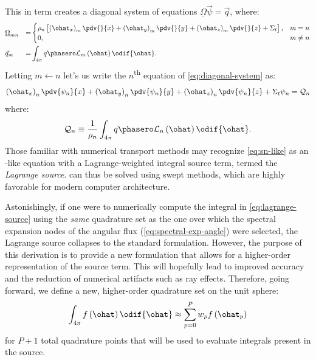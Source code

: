 This in term creates a diagonal system of equations $\underline{\Omega}\vec{\psi}=\vec{q}$, where:
\begin{equation}
  \label{eq:diagonal-system}
  \begin{aligned}
     & \underline{\Omega}_{mn} & = & \begin{cases}
                                       \rho_n\left[\left(\ohat_x\right)_m\pdv{}{x}+\left(\ohat_y\right)_m\pdv{}{y}+\left(\ohat_z\right)_m\pdv{}{z}+\Sigma_t\right], & m=n     \\
                                       0,                                                                                                                           & m\neq n
                                     \end{cases} \\
     & \vec{q}_m               & = & \int_{4\pi}q\phasero\mathcal{L}_m\left(\ohat\right) \odif{\ohat}.
  \end{aligned}
\end{equation}
Letting $m\leftarrow n$ let's us write the $n$\textsuperscript{th} equation of \cref{eq:diagonal-system} as:
\begin{equation}
  \label{eq:sn-like}
  \left(\ohat_x\right)_n\pdv{\psi_n}{x}+\left(\ohat_y\right)_n\pdv{\psi_n}{y}+\left(\ohat_z\right)_n\pdv{\psi_n}{z}+\Sigma_t\psi_n =  \mathcal{Q}_n
\end{equation}
where:
\begin{equation}
  \label{eq:lagrange-source}
  \mathcal{Q}_n\equiv\frac{1}{\rho_n}\int_{4\pi}q\phasero\mathcal{L}_n\left(\ohat\right)\odif{\ohat}.
\end{equation}
Those familiar with numerical transport methods may recognize \cref{eq:sn-like} as an \Sn-like equation with a Lagrange-weighted integral source term, termed the \textit{Lagrange source}.
 can thus be solved using swept methods, which are highly favorable for modern computer architecture.

Astonishingly, if one were to numerically compute the integral in \cref{eq:lagrange-source} using the \emph{same} quadrature set as the one over which the spectral expansion nodes of the angular flux (\cref{eq:spectral-exp-angle}) were selected, the Lagrange source collapses to the standard \Sn formulation.
However, the purpose of this derivation is to provide a new formulation that allows for a higher-order representation of the source term.
This will hopefully lead to improved accuracy and the reduction of numerical artifacts such as ray effects.
Therefore, going forward, we define a new, higher-order quadrature set on the unit sphere:
\begin{equation}
  \label{eq:high-order-spherical-quad-set}
  \int_{4\pi}f\left(\ohat\right)\odif{\ohat}\approx \sum_{p=0}^{P}w_p f\left(\ohat_p\right)
\end{equation}
for $P+1$ total quadrature points that will be used to evaluate integrals present in the source.

